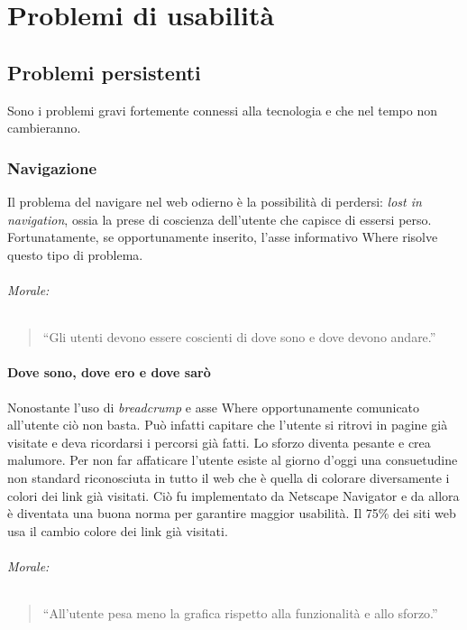 
\chapter{Problemi di usabilità}

	\section{Problemi persistenti}
		Sono i problemi gravi fortemente connessi alla tecnologia e che nel tempo non cambieranno.
	
		\subsection{Navigazione}
			Il problema del navigare nel web odierno è la possibilità di perdersi: \emph{lost in navigation}, ossia la prese di coscienza dell'utente che capisce di essersi perso. Fortunatamente, se opportunamente inserito, l'asse informativo Where risolve questo tipo di problema.
			\subparagraph*{Morale:}
			\begin{quote}
				``Gli utenti devono essere coscienti di dove sono e dove devono andare.''
			\end{quote}
			
			\subsubsection{Dove sono, dove ero e dove sarò}
				Nonostante l'uso di \emph{breadcrump} e asse Where opportunamente comunicato all'utente ciò non basta. Può infatti capitare che l'utente si ritrovi in pagine già visitate e deva ricordarsi i percorsi già fatti. Lo sforzo diventa pesante e crea malumore. Per non far affaticare l'utente esiste al giorno d'oggi una consuetudine non standard riconosciuta in tutto il web che è quella di colorare diversamente i colori dei link già visitati. Ciò fu implementato da Netscape Navigator e da allora è diventata una buona norma per garantire maggior usabilità.
				Il 75\% dei siti web usa il cambio colore dei link già visitati.
			\subparagraph*{Morale:}
			\begin{quote}
				``All'utente pesa meno la grafica rispetto alla funzionalità e allo sforzo.''
			\end{quote}	
			
